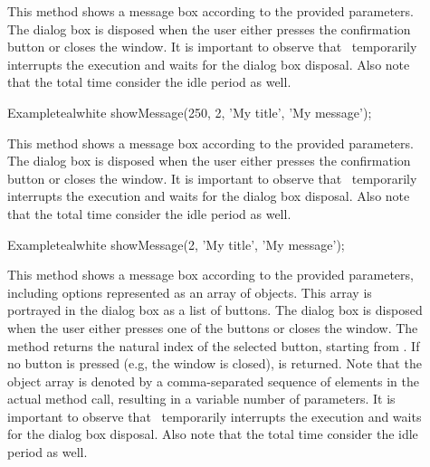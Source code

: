 \begin{description}
\item[]

This method shows a message box according to the provided parameters. The dialog box is disposed when the user either presses the confirmation button or closes the window. It is important to observe that \arara\ temporarily interrupts the execution and waits for the dialog box disposal. Also note that the total time consider the idle period as well.

\begin{codebox}{Example}{teal}{\icnote}{white}
showMessage(250, 2, 'My title', 'My message');
\end{codebox}

\item[]

This method shows a message box according to the provided parameters. The dialog box is disposed when the user either presses the confirmation button or closes the window. It is important to observe that \arara\ temporarily interrupts the execution and waits for the dialog box disposal. Also note that the total time consider the idle period as well.

\begin{codebox}{Example}{teal}{\icnote}{white}
showMessage(2, 'My title', 'My message');
\end{codebox}

\item[]

This method shows a message box according to the provided parameters, including options represented as an array of  objects. This array is portrayed in the dialog box as a list of buttons. The dialog box is disposed when the user either presses one of the buttons or closes the window. The method returns the natural index of the selected button, starting from . If no button is pressed (e.g, the window is closed),  is returned. Note that the object array is denoted by a  comma-separated sequence of elements in the actual method call, resulting in a variable number of parameters. It is important to observe that \arara\ temporarily interrupts the execution and waits for the dialog box disposal. Also note that the total time consider the idle period as well.


\end{description}
